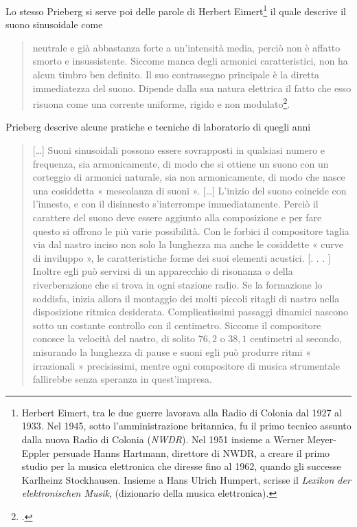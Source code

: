 Lo stesso Prieberg si serve poi delle parole di Herbert Eimert\footnote{
	Herbert Eimert, tra le due guerre lavorava alla Radio di Colonia dal 1927 al 1933. Nel 1945, sotto l'amministrazione britannica, fu il primo tecnico assunto dalla nuova Radio di Colonia (\emph{NWDR}). Nel 1951 insieme a Werner Meyer-Eppler persuade Hanns Hartmann, direttore di NWDR, a creare il primo studio per la musica elettronica che diresse fino al 1962, quando gli successe Karlheinz Stockhausen. Insieme a Hans Ulrich Humpert, scrisse il \emph{Lexikon der elektronischen Musik}, (dizionario della musica elettronica).
} il quale descrive il suono sinusoidale come

\begin{quote}
  neutrale e già abbastanza forte a un’intensità media, perciò non è affatto smorto e insussistente. Siccome manca degli armonici caratteristici, non ha alcun timbro ben definito. Il suo contrassegno principale è la diretta immediatezza del suono. Dipende dalla sua natura elettrica il fatto che esso risuona come una corrente uniforme, rigido e non modulato\footcite[\emph{idem}]{prieberg:mexm}.
\end{quote}

Prieberg descrive alcune pratiche e tecniche di laboratorio di quegli anni

\begin{quote}
	[\ldots] Suoni sinusoidali possono essere sovrapposti in qualsiasi numero e frequenza, sia armonicamente, di modo che si ottiene un suono con un corteggio di armonici naturale, sia non armonicamente, di modo che nasce una cosiddetta « mescolanza di suoni ». [\ldots] L’inizio del suono coincide con l’innesto, e con il disinnesto s’interrompe immediatamente. Perciò il carattere del suono deve essere aggiunto alla composizione e per fare questo si offrono le più varie possibilità. Con le forbici il compositore taglia via dal nastro inciso non solo la lunghezza ma anche le cosiddette « curve di inviluppo », le caratteristiche forme dei suoi elementi acustici. [. . . ] Inoltre egli può servirsi di un apparecchio di risonanza o della riverberazione che si trova in ogni stazione radio. Se la formazione lo soddisfa, inizia allora il montaggio dei molti piccoli ritagli di nastro nella disposizione ritmica desiderata.
	Complicatissimi passaggi dinamici nascono sotto un costante controllo con il centimetro. Siccome il compositore conosce la velocità del nastro, di solito $ 76,2 $ o $ 38,1 $ centimetri al secondo, misurando la lunghezza di pause e suoni egli può produrre ritmi « irrazionali » precisissimi, mentre ogni compositore di musica strumentale fallirebbe senza speranza in quest’impresa.
\end{quote}

